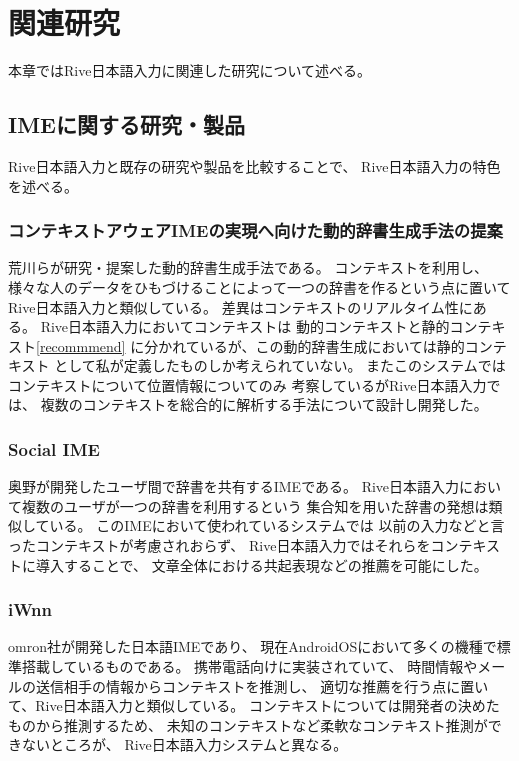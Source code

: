 \chapter{関連研究}
\label{chap:related}
本章ではRive日本語入力に関連した研究について述べる。

\newpage
\section{IMEに関する研究・製品}
Rive日本語入力と既存の研究や製品を比較することで、
Rive日本語入力の特色を述べる。

\subsection{コンテキストアウェアIMEの実現へ向けた動的辞書生成手法の提案}
荒川らが研究・提案した動的辞書生成手法である。\cite{dynamicdictionarygeneration}
コンテキストを利用し、
様々な人のデータをひもづけることによって一つの辞書を作るという点に置いて
Rive日本語入力と類似している。
差異はコンテキストのリアルタイム性にある。
Rive日本語入力においてコンテキストは
動的コンテキストと静的コンテキスト\ref{recommmend}
に分かれているが、この動的辞書生成においては静的コンテキスト
として私が定義したものしか考えられていない。
またこのシステムではコンテキストについて位置情報についてのみ
考察しているがRive日本語入力では、
複数のコンテキストを総合的に解析する手法について設計し開発した。

\subsection{Social IME}
奥野が開発したユーザ間で辞書を共有するIMEである。\cite{socialime}
Rive日本語入力において複数のユーザが一つの辞書を利用するという
集合知を用いた辞書の発想は類似している。
このIMEにおいて使われているシステム\cite{奥野陽:2009-03-18}では
以前の入力などと言ったコンテキストが考慮されおらず、
Rive日本語入力ではそれらをコンテキストに導入することで、
文章全体における共起表現などの推薦を可能にした。

\subsection{iWnn}
omron社が開発した日本語IMEであり、\cite{iwnn}
現在AndroidOSにおいて多くの機種で標準搭載しているものである。
携帯電話向けに実装されていて、
時間情報やメールの送信相手の情報からコンテキストを推測し、
適切な推薦を行う点に置いて、Rive日本語入力と類似している。
コンテキストについては開発者の決めたものから推測するため、
未知のコンテキストなど柔軟なコンテキスト推測ができないところが、
Rive日本語入力システムと異なる。

